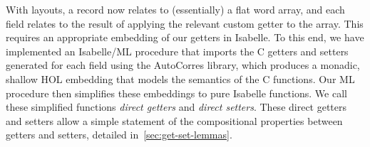 With layouts, a \cogent record now relates to (essentially) a flat word array, and each
\cogent field relates to the result of applying the relevant custom
getter to the array.
This requires an appropriate embedding of our getters in Isabelle.
To this end, we have implemented an Isabelle/ML procedure that imports the C getters and setters generated for each field using the AutoCorres library, which produces a monadic, shallow HOL embedding that models the semantics of the C functions. Our ML procedure then simplifies these embeddings to pure Isabelle functions.
We call these simplified functions
\emph{direct getters} and \emph{direct setters}.
These direct getters and setters allow a simple statement
of the compositional properties between getters and setters,
detailed in~\autoref{sec:get-set-lemmas}.



